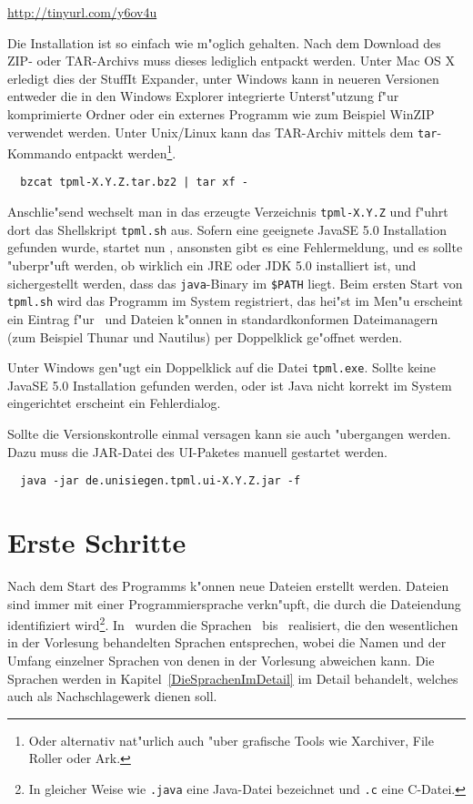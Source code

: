 \url{http://tinyurl.com/y6ov4u}

Die Installation ist so einfach wie m"oglich gehalten. Nach dem Download des ZIP- oder TAR-Archivs muss dieses
lediglich entpackt werden. Unter Mac OS X erledigt dies der StuffIt Expander, unter Windows kann in
neueren Versionen entweder die in den Windows Explorer integrierte Unterst"utzung f"ur komprimierte
Ordner oder ein externes Programm wie zum Beispiel WinZIP verwendet werden. Unter Unix/Linux kann
das TAR-Archiv mittels dem {\tt tar}-Kommando entpackt werden\footnote{Oder alternativ nat"urlich
auch "uber grafische Tools wie Xarchiver, File Roller oder Ark.}.
\begin{verbatim}
  bzcat tpml-X.Y.Z.tar.bz2 | tar xf -
\end{verbatim}
Anschlie"send wechselt man in das erzeugte Verzeichnis {\tt tpml-X.Y.Z} und f"uhrt dort das Shellskript
{\tt tpml.sh} aus. Sofern eine geeignete JavaSE 5.0 Installation gefunden wurde, startet nun \TPML,
ansonsten gibt es eine Fehlermeldung, und es sollte "uberpr"uft werden, ob wirklich ein JRE oder JDK
5.0 installiert ist, und sichergestellt werden, dass das {\tt java}-Binary im {\tt \$PATH} liegt. Beim
ersten Start von {\tt tpml.sh} wird das Programm im System registriert, das hei"st im Men"u erscheint
ein Eintrag f"ur \TPML\ und Dateien k"onnen in standardkonformen Dateimanagern (zum Beispiel Thunar
und Nautilus) per Doppelklick ge"offnet werden.

Unter Windows gen"ugt ein Doppelklick auf die Datei {\tt tpml.exe}. Sollte keine JavaSE 5.0
Installation gefunden werden, oder ist Java nicht korrekt im System eingerichtet erscheint
ein Fehlerdialog.

Sollte die Versionskontrolle einmal versagen kann sie auch "ubergangen werden. Dazu muss die JAR-Datei des UI-Paketes manuell gestartet werden.
\begin{verbatim}
  java -jar de.unisiegen.tpml.ui-X.Y.Z.jar -f
\end{verbatim}



\section{Erste Schritte}

Nach dem Start des Programms k"onnen neue Dateien erstellt werden. Dateien sind immer mit einer
Programmiersprache verkn"upft, die durch die Dateiendung identifiziert wird\footnote{In gleicher
Weise wie {\tt .java} eine Java-Datei bezeichnet und {\tt .c} eine C-Datei.}. In \TPML\ wurden
die Sprachen \LZERO\ bis \LFOUR\ realisiert, die den wesentlichen in der Vorlesung behandelten
Sprachen entsprechen, wobei die Namen und der Umfang
einzelner Sprachen von denen in der Vorlesung abweichen kann. Die Sprachen werden in
Kapitel~\ref{DieSprachenImDetail} im Detail behandelt, welches auch als Nachschlagewerk
dienen soll.

